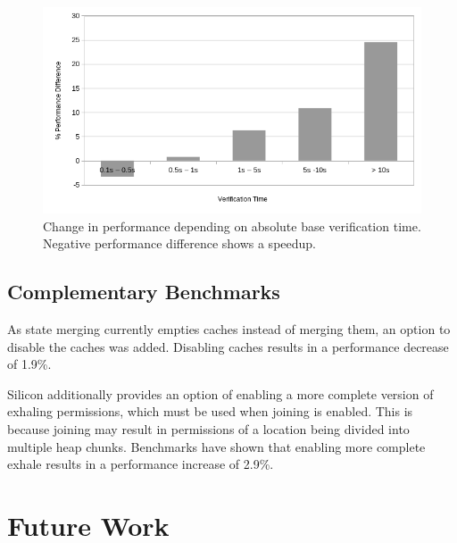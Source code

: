 \documentclass[11pt]{article}
\begin{document}
    \begin{figure}[H]
        \includegraphics[width=\linewidth]{performance-change-vs-verification-time.png}
        \caption{
            Change in performance depending on absolute base verification time. Negative performance difference shows a speedup.
        }
        \label{fig:state-merges}
    \end{figure}

    \subsection{Complementary Benchmarks}

    As state merging currently empties caches instead of merging them, an option to disable the caches
    was added. Disabling caches results in a performance decrease of 1.9\%.

    Silicon additionally provides an option of enabling a more complete version of exhaling permissions,
    which must be used when joining is enabled. This is because joining may result in permissions of a 
    location being divided into multiple heap chunks. Benchmarks have shown that enabling more complete 
    exhale results in a performance increase of 2.9\%.

    \newpage
    \section{Future Work}

    

    \newpage
    \printbibliography
    
\end{document}
